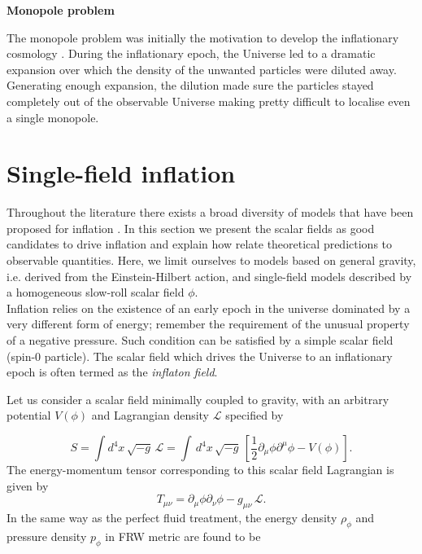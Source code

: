 \documentclass{rmaa}
\def\beq{\begin{equation}}
\def\eeq{\end{equation}}
\begin{document}
\vskip 16pt
\noindent
\textbf{Monopole problem}
\vskip 6pt

The monopole problem was initially the motivation to develop the inflationary
cosmology \citep{Guth2}.
%
During the inflationary epoch, the Universe led to a dramatic expansion
over which the density of the unwanted particles were diluted away. Generating enough
expansion, the dilution made sure the particles stayed completely out of the observable Universe
making pretty difficult to localise even a single monopole.     





\section{Single-field inflation}
\vskip 6pt


Throughout the literature there exists a broad diversity of models that have been proposed for inflation 
\citep{LiddleLyth, Olive, Lyth}. In this section we present the scalar fields as good candidates 
to drive inflation and explain how relate theoretical predictions to observable quantities. 
Here, we limit ourselves to models based on general gravity, i.e. derived from the
Einstein-Hilbert action, and single-field models described by a homogeneous slow-roll scalar field $\phi$.
\\

Inflation relies on the existence of an early epoch in the universe dominated by a very 
different form of energy; remember the requirement of the unusual property of a negative 
pressure. Such condition can be satisfied by a simple scalar field (spin-0 particle). 
The scalar field which drives the Universe to an inflationary epoch is often termed 
as the \textit{inflaton field}. 
%

Let us consider a scalar field minimally coupled to gravity, with an arbitrary
potential $V(\phi)$ and Lagrangian density $\mathcal{L}$ specified by 


\begin{equation}
S=\int d^4x\, \sqrt{-g}\,\mathcal{L}=\int\, d^4x\, \sqrt{-g}\,
\left[\frac{1}{2}
\partial_{\mu}\phi
\partial^{\mu}\phi -V(\phi)\right].
\end{equation}
%
%
The energy-momentum tensor corresponding to this scalar field Lagrangian is given by
\beq
T_{\mu\nu}=\partial_{\mu}\phi \partial_{\nu}\phi
-g_{\mu\nu}\, \mathcal{L}.
\eeq
%
In the same way as the perfect fluid treatment, the 
energy density $\rho_\phi$ and pressure density $p_\phi$ in FRW metric are found to be 
\end{document}
